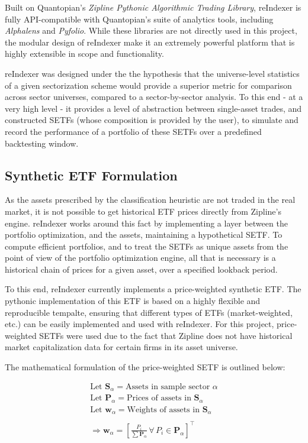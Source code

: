 \documentclass[../main.tex]{subfiles}
\begin{document}
Built on Quantopian's \textit{Zipline Pythonic Algorithmic Trading Library}, reIndexer is fully API-compatible with Quantopian's suite of analytics tools, including \textit{Alphalens} and \textit{Pyfolio}. While these libraries are not directly used in this project, the modular design of reIndexer make it an extremely powerful platform that is highly extensible in scope and functionality.

reIndexer was designed under the the hypothesis that the universe-level statistics of a given sectorization scheme would provide a superior metric for comparison across sector universes, compared to a sector-by-sector analysis. To this end - at a very high level - it provides a level of abstraction between single-asset trades, and constructed SETFs (whose composition is provided by the user), to simulate and record the performance of a portfolio of these SETFs over a predefined backtesting window.

\subsection{Synthetic ETF Formulation}

As the assets prescribed by the classification heuristic are not traded in the real market, it is not possible to get historical ETF prices directly from Zipline's engine. reIndexer works around this fact by implementing a layer between the portfolio optimization, and the assets, maintaining a hypothetical SETF. To compute efficient portfolios, and to treat the SETFs as unique assets from the point of view of the portfolio optimization engine, all that is necessary is a historical chain of prices for a given asset, over a specified lookback period.

To this end, reIndexer currently implements a price-weighted synthetic ETF. The pythonic implementation of this ETF is based on a highly flexible and reproducible tempalte, ensuring that different types of ETFs (market-weighted, etc.) can be easily implemented and used with reIndexer. For this project, price-weighted SETFs were used due to the fact that Zipline does not have historical market capitalization data for certain firms in its asset universe.

The mathematical formulation of the price-weighted SETF is outlined below:

\begin{gather*}
    \text{Let $\boldsymbol{S}_\alpha$} = \text{Assets in sample sector $\alpha$} \\
    \text{Let $\boldsymbol{P}_\alpha$} = \text{Prices of assets in $\boldsymbol{S}_\alpha$} \\
    \text{Let $\boldsymbol{w}_\alpha$} = \text{Weights of assets in $\boldsymbol{S}_\alpha$} \\
    \\
    \Rightarrow \boldsymbol{w}_\alpha = \left[ \frac{P_i}{\sum \boldsymbol{P}_\alpha} \, \forall \, P_i \in \boldsymbol{P}_\alpha \right]^\intercal
\end{gather*}
\end{document}
